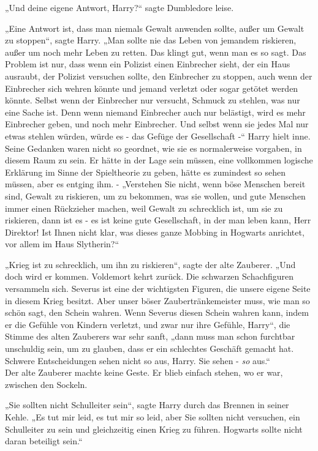 {„Und deine eigene Antwort, Harry?“ sagte Dumbledore leise.

„Eine Antwort ist, dass man niemals Gewalt anwenden sollte, außer um Gewalt zu stoppen“, sagte Harry. „Man sollte nie das Leben von jemandem riskieren, außer um noch mehr Leben zu retten. Das klingt gut, wenn man es so sagt. Das Problem ist nur, dass wenn ein Polizist einen Einbrecher sieht, der ein Haus ausraubt, der Polizist versuchen sollte, den Einbrecher zu stoppen, auch wenn der Einbrecher sich wehren könnte und jemand verletzt oder sogar getötet werden könnte. Selbst wenn der Einbrecher nur versucht, Schmuck zu stehlen, was nur eine Sache ist. Denn wenn niemand Einbrecher auch nur belästigt, wird es mehr Einbrecher geben, und noch mehr Einbrecher. Und selbst wenn sie jedes Mal nur etwas stehlen würden, würde es - das Gefüge der Gesellschaft -“ Harry hielt inne.\\ Seine Gedanken waren nicht so geordnet, wie sie es normalerweise vorgaben, in diesem Raum zu sein. Er hätte in der Lage sein müssen, eine vollkommen logische Erklärung im Sinne der Spieltheorie zu geben, hätte es zumindest so sehen müssen, aber es entging ihm. - „Verstehen Sie nicht, wenn böse Menschen bereit sind, Gewalt zu riskieren, um zu bekommen, was sie wollen, und gute Menschen immer einen Rückzieher machen, weil Gewalt zu schrecklich ist, um sie zu riskieren, dann ist es - es ist keine gute Gesellschaft, in der man leben kann, Herr Direktor! Ist Ihnen nicht klar, was dieses ganze Mobbing in Hogwarts anrichtet, vor allem im Haus Slytherin?“

„Krieg ist zu schrecklich, um ihn zu riskieren“, sagte der alte Zauberer. „Und doch wird er kommen. Voldemort kehrt zurück. Die schwarzen Schachfiguren versammeln sich. Severus ist eine der wichtigsten Figuren, die unsere eigene Seite in diesem Krieg besitzt. Aber unser böser Zaubertränkemeister muss, wie man so schön sagt, den Schein wahren. Wenn Severus diesen Schein wahren kann, indem er die Gefühle von Kindern verletzt, und zwar nur ihre Gefühle, Harry“, die Stimme des alten Zauberers war sehr sanft, „dann muss man schon furchtbar unschuldig sein, um zu glauben, dass er ein schlechtes Geschäft gemacht hat. Schwere Entscheidungen sehen nicht so aus, Harry. Sie sehen - \emph{so} aus.“\\ Der alte Zauberer machte keine Geste. Er blieb einfach stehen, wo er war, zwischen den Sockeln.

„Sie sollten nicht Schulleiter sein“, sagte Harry durch das Brennen in seiner Kehle. „Es tut mir leid, es tut mir so leid, aber Sie sollten nicht versuchen, ein Schulleiter zu sein und gleichzeitig einen Krieg zu führen. Hogwarts sollte nicht daran beteiligt sein.“

}
